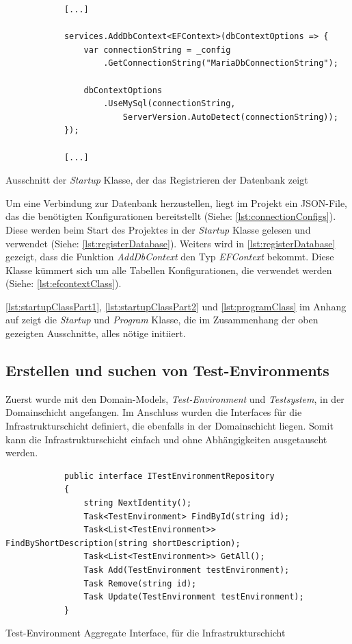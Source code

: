 \documentclass[a4paper, fontsize=11pt, parskip=half, twoside]{scrreprt}
\begin{document}
	\begin{listing}[ht]
		\begin{verbatim}
			[...]
			
			services.AddDbContext<EFContext>(dbContextOptions => {
				var connectionString = _config
					.GetConnectionString("MariaDbConnectionString");
				
				dbContextOptions
					.UseMySql(connectionString,
						ServerVersion.AutoDetect(connectionString));
			});
			
			[...]
		\end{verbatim}
		\caption{Ausschnitt der \emph{Startup} Klasse, der das Registrieren der Datenbank zeigt}
		\label{lst:registerDatabase}
	\end{listing}

	Um eine Verbindung zur Datenbank herzustellen, liegt im Projekt ein \ac{JSON}-File, das die benötigten Konfigurationen bereitstellt (Siehe: \autoref{lst:connectionConfigs}).
	Diese werden beim Start des Projektes in der \emph{Startup} Klasse gelesen und verwendet (Siehe: \autoref{lst:registerDatabase}).
	Weiters wird in \autoref{lst:registerDatabase} gezeigt, dass die Funktion \emph{AddDbContext} den Typ \emph{EFContext} bekommt. 
	Diese Klasse kümmert sich um alle Tabellen Konfigurationen, die verwendet werden (Siehe: \autoref{lst:efcontextClass}).

	\autoref{lst:startupClassPart1}, \ref{lst:startupClassPart2} und \ref{lst:programClass} im Anhang auf  zeigt die \emph{Startup} und \emph{Program} Klasse, die im Zusammenhang der oben gezeigten Ausschnitte, alles nötige initiiert.

	\subsection{Erstellen und suchen von Test-Environments} \label{subsec:createAndSearchTestEnvironments}
	Zuerst wurde mit den Domain-Models, \emph{Test-Environment} und \emph{Testsystem}, in der Domainschicht angefangen.
	Im Anschluss wurden die Interfaces für die Infrastrukturschicht definiert, die ebenfalls in der Domainschicht liegen.
	Somit kann die Infrastrukturschicht einfach und ohne Abhängigkeiten ausgetauscht werden.
	
	\begin{listing}[ht]
		\begin{verbatim}
			public interface ITestEnvironmentRepository
			{
				string NextIdentity();
				Task<TestEnvironment> FindById(string id);
				Task<List<TestEnvironment>> FindByShortDescription(string shortDescription);
				Task<List<TestEnvironment>> GetAll();
				Task Add(TestEnvironment testEnvironment);
				Task Remove(string id);
				Task Update(TestEnvironment testEnvironment);
			}
		\end{verbatim}
		\caption{Test-Environment Aggregate Interface, für die Infrastrukturschicht}
		\label{lst:testEnvironmentRepository}
	\end{listing}
\end{document}
